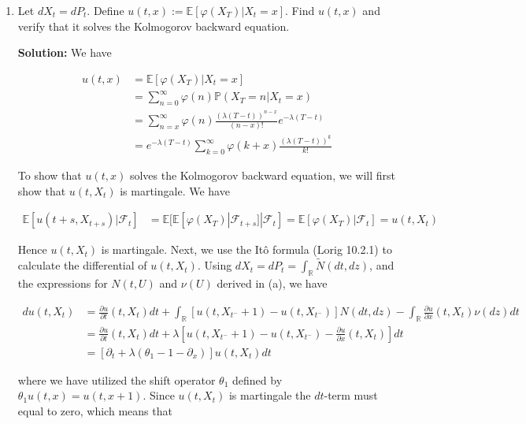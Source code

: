 \documentclass[12pt, a4paper]{article}
\begin{document}
\begin{enumerate}
\begin{enumerate}
            \item Let $dX_t = dP_t$. Define $u(t,x):= \mathbb E[\varphi(X_T)|X_t = x]$. Find $u(t,x)$ and verify that it solves the Kolmogorov backward equation. 
            
            \textbf{Solution:} We have 

            \begin{align*}
                u(t,x) &= \mathbb E[\varphi(X_T)|X_t = x] \\
                &= \sum_{n=0}^\infty \varphi(n)\mathbb P (X_T = n| X_t=x)\\
                &= \sum_{n=x}^\infty \varphi(n) \frac{(\lambda(T-t))^{n-x}}{(n-x)!} e^{-\lambda(T-t)} \\
                &= e^{-\lambda(T-t)}\sum_{k=0}^\infty \varphi(k+x) \frac{(\lambda(T-t))^k}{k!}
            \end{align*}

            To show that $u(t,x)$ solves the Kolmogorov backward equation, we will first show that $u(t,X_t)$ is martingale. We have 

            \begin{align*}
                \mathbb E[u(t+s, X_{t+s})|\mathcal F_t] &= \mathbb E[\mathbb E[\varphi(X_T)|\mathcal F_{t+s}]|\mathcal F_t] = \mathbb E[\varphi(X_T)|\mathcal F_t] = u(t, X_t)
            \end{align*}

            Hence $u(t,X_t)$ is martingale. Next, we use the Itô formula (Lorig 10.2.1) to calculate the differential of $u(t,X_t)$. Using $dX_t=dP_t=\int_{\mathbb R} \tilde N(dt, dz)$, and the expressions for $N(t,U)$ and $\nu(U)$ derived in (a), we have 

            \begin{align*}
                du(t,X_t) &= \frac{\partial u}{\partial t}(t,X_t) dt + \int_{\mathbb R} \left[ u(t, X_{t^-} + 1) - u(t, X_{t^-}) \right] N(dt, dz) - \int_{\mathbb R} \frac{\partial u}{\partial x}(t, X_t) \nu(dz) dt \\
                &= \frac{\partial u}{\partial t}(t,X_t) dt + \lambda \left[ u(t, X_{t^-} + 1) - u(t, X_{t^-}) - \frac{\partial u}{\partial x}(t, X_t) \right]dt \\
                &= \left[ \partial_t + \lambda \left( \theta_1 - 1 - \partial_x  \right) \right]u(t, X_t)dt
            \end{align*}

            where we have utilized the shift operator $\theta_1$ defined by $\theta_1 u(t,x) = u(t,x+1)$. Since $u(t,X_t)$ is martingale the $dt$-term must equal to zero, which means that 


\end{enumerate}
\end{enumerate}
\end{document}
